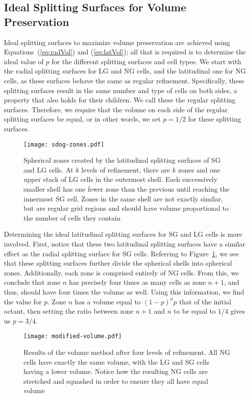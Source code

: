 \subsection{Ideal Splitting Surfaces for Volume Preservation} \label{chap:4:ideal}
Ideal splitting surfaces to maximize volume preservation are achieved using Equations~(\ref{eq:radVol}) and (\ref{eq:latVol}); all that is required is to determine the ideal value of $p$ for the different splitting surfaces and cell types.
We start with the radial splitting surfaces for LG and NG cells, and the latitudinal one for NG cells, as these surfaces behave the same as regular refinement.
Specifically, these splitting surfaces result in the same number and type of cells on both sides, a property that also holds for their children.
We call these the regular splitting surfaces.
Therefore, we require that the volume on each side of the regular splitting surfaces be equal, or in other words, we set $p = 1/2$ for these splitting surfaces.


\begin{figure}[ht!]
	\centering
	\texttt{[image: sdog-zones.pdf]}
	\caption[Title]{
		Spherical zones created by the latitudinal splitting surfaces of SG and LG cells.
		At $k$ levels of refinement, there are $k$ zones and one upper stack of LG cells in the outermost shell.
		Each successively smaller shell has one fewer zone than the previous until reaching the innermost SG cell.
		Zones in the same shell are not exactly similar, but are regular grid regions and should have volume proportional to the number of cells they contain
	}
	\label{fig:sdog-zones}
\end{figure}


Determining the ideal latitudinal splitting surfaces for SG and LG cells is more involved.
First, notice that these two latitudinal splitting surfaces have a similar effect as the radial splitting surface for SG cells.
Referring to Figure~\ref{fig:sdog-zones}, we see that these splitting surfaces further divide the spherical shells into spherical zones.
Additionally, each zone is comprised entirely of NG cells.
From this, we conclude that zone $n$ has precisely four times as many cells as zone $n+1$, and thus, should have four times the volume as well.
Using this information, we find the value for $p$.
Zone $n$ has a volume equal to $\left( 1 - p \right)^{n} p$ that of the initial octant, then setting the ratio between zone $n+1$ and $n$ to be equal to $1/4$ gives us $p = 3/4$.


\begin{figure}[ht!]
	\centering
	\texttt{[image: modified-volume.pdf]}
	\caption[Title]{
		Results of the volume method after four levels of refinement.
		All NG cells have exactly the same volume, with the LG and SG cells having a lower volume.
		Notice how the resulting NG cells are stretched and squashed in order to ensure they all have equal volume
	}
	\label{fig:modified-volume}
\end{figure}


